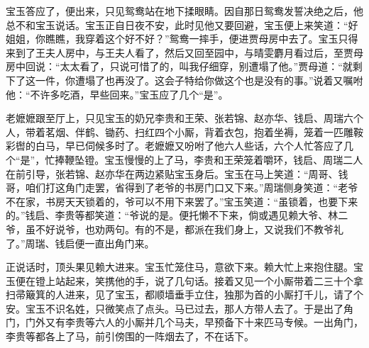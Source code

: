 \documentclass[12pt,oneside]{book}
\begin{document}
宝玉答应了，便出来，只见鸳鸯站在地下揉眼睛。因自那日鸳鸯发誓决绝之后，他总不和宝玉说话。宝玉正自日夜不安，此时见他又要回避，宝玉便上来笑道：“好姐姐，你瞧瞧，我穿着这个好不好？”鸳鸯一摔手，便进贾母房中去了。宝玉只得来到了王夫人房中，与王夫人看了，然后又回至园中，与晴雯麝月看过后，至贾母房中回说：“太太看了，只说可惜了的，叫我仔细穿，别遭塌了他。”贾母道：“就剩下了这一件，你遭塌了也再没了。这会子特给你做这个也是没有的事。”说着又嘱咐他：“不许多吃酒，早些回来。”宝玉应了几个“是”。

老嬷嬷跟至厅上，只见宝玉的奶兄李贵和王荣、张若锦、赵亦华、钱启、周瑞六个人，带着茗烟、伴鹤、锄药、扫红四个小厮，背着衣包，抱着坐褥，笼着一匹雕鞍彩辔的白马，早已伺候多时了。老嬷嬷又吩咐了他六人些话，六个人忙答应了几个“是”，忙捧鞭坠镫。宝玉慢慢的上了马，李贵和王荣笼着嚼环，钱启、周瑞二人在前引导，张若锦、赵亦华在两边紧贴宝玉身后。宝玉在马上笑道：“周哥、钱哥，咱们打这角门走罢，省得到了老爷的书房门口又下来。”周瑞侧身笑道：“老爷不在家，书房天天锁着的，爷可以不用下来罢了。”宝玉笑道：“虽锁着，也要下来的。”钱启、李贵等都笑道：“爷说的是。便托懒不下来，倘或遇见赖大爷、林二爷，虽不好说爷，也劝两句。有的不是，都派在我们身上，又说我们不教爷礼了。”周瑞、钱启便一直出角门来。

正说话时，顶头果见赖大进来。宝玉忙笼住马，意欲下来。赖大忙上来抱住腿。宝玉便在镫上站起来，笑携他的手，说了几句话。接着又见一个小厮带着二三十个拿扫帚簸箕的人进来，见了宝玉，都顺墙垂手立住，独那为首的小厮打千儿，请了个安。宝玉不识名姓，只微笑点了点头。马已过去，那人方带人去了。于是出了角门，门外又有李贵等六人的小厮并几个马夫，早预备下十来匹马专候。一出角门，李贵等都各上了马，前引傍围的一阵烟去了，不在话下。
\end{document}
